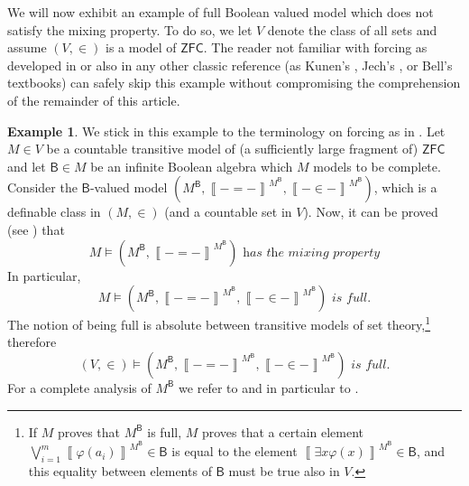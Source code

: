 \documentclass[11pt]{amsart}
\newcommand{\nphi}{\varphi}
\theoremstyle{plain}
\theoremstyle{definition}
\newtheorem{example}[theorem]{Example}
\theoremstyle{plain}
\theoremstyle{remark}
\newcommand{\ZFC}{\ensuremath{\mathsf{ZFC}}}
\newcommand{\bool}[1]{\mathsf{#1}}
\newcommand{\Qp}[1]{\left\llbracket #1 \right\rrbracket}
\newcommand{\0}{\mathsf{0}}
\renewcommand{\1}{\mathsf{1}}
\renewcommand{\2}{\mathsf{2}}
\theoremstyle{definition}
\begin{document}
We will now exhibit an example of full Boolean valued model which does not satisfy the mixing property. To do so, we let $V$ 
denote the class of all sets and assume $(V,\in)$ is a model of \ZFC. The reader not familiar with forcing as developed in \cite{viale-bookonforcing} or also in any other classic reference (as
Kunen's \cite{KUNEN}, Jech's \cite{JECH}, or Bell's \cite{BELL} textbooks) can safely skip this example without compromising the comprehension of the remainder of this article.
\begin{example}\label{ex:fullnotimplmix}
\label{non:mix}
We stick in this example to the  terminology on forcing as in \cite{viale-bookonforcing}.
Let $M\in V$ be a countable transitive model of (a sufficiently large fragment of) $\ZFC$ and let $\bool{B}\in M$ be an 
infinite Boolean algebra which $M$ models to be complete. Consider the $\bool{B}$-valued model 
$(M^{\bool{B}},\Qp{-=-}^{M^{\bool{B}}},\Qp{-\in-}^{M^{\bool{B}}})$, which is a definable class in $(M,\in)$ 
(and a countable set in $V$). Now, it can be proved (see \cite[Mixing Lemma 7.2.1]{viale-bookonforcing}) that
\[
M\models (M^{\bool{B}},\Qp{-=-}^{M^{\bool{B}}})\textit{ has the mixing property}
\]
In particular,
\[
M\models (M^{\bool{B}},\Qp{-=-}^{M^{\bool{B}}},\Qp{-\in-}^{M^{\bool{B}}})\textit{ is full}.
\]
The notion of being full is absolute between transitive models of set theory,\footnote{If $M$ proves that $M^{\bool{B}}$ is full, $M$ proves that a certain element $\bigvee_{i=1}^m\Qp{\nphi(a_i)}^{M^{\bool{B}}}\in\bool{B}$ is equal to the element 
$\Qp{\exists x\nphi(x)}^{M^{\bool{B}}}\in\bool{B}$, and this equality between elements of $\bool{B}$ must be true also in $V$.} 
therefore
\[
(V,\in)\models(M^{\bool{B}},\Qp{-=-}^{M^{\bool{B}}},\Qp{-\in-}^{M^{\bool{B}}})\textit{ is full}.
\]
For a complete analysis of $M^\bool{B}$ we refer to \cite[Sections 7.1.2 and 7.2]{viale-bookonforcing} and in particular to \cite[Lemma 7.2.1]{viale-bookonforcing}.


\end{example}
\end{document}
